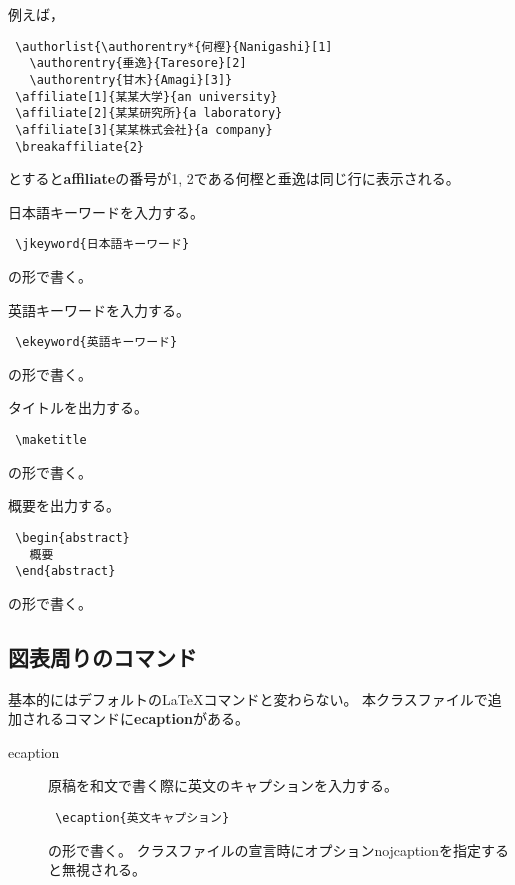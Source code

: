 \documentclass[fleqn]{ieej-tec2}%
\newcommand{\bs}{\texttt{\symbol{'134}}}
\begin{document}
\begin{description}
例えば，
\begin{verbatim}
 \authorlist{\authorentry*{何樫}{Nanigashi}[1]
   \authorentry{垂逸}{Taresore}[2] 
   \authorentry{甘木}{Amagi}[3]}
 \affiliate[1]{某某大学}{an university}
 \affiliate[2]{某某研究所}{a laboratory}
 \affiliate[3]{某某株式会社}{a company}
 \breakaffiliate{2}        
\end{verbatim}
とすると\textbf{\bs affiliate}の番号が1, 2である何樫と垂逸は同じ行に表示される。

\item[\bs jkeyword]
日本語キーワードを入力する。
\begin{verbatim}
 \jkeyword{日本語キーワード}
\end{verbatim}
の形で書く。

\item[\bs ekeyword]
英語キーワードを入力する。
\begin{verbatim}
 \ekeyword{英語キーワード}
\end{verbatim}
の形で書く。

\item[\bs maketitle]
タイトルを出力する。
\begin{verbatim}
 \maketitle
\end{verbatim}
の形で書く。

\item[abstract環境]
概要を出力する。
\begin{verbatim}
 \begin{abstract}
   概要
 \end{abstract}
\end{verbatim}
の形で書く。

\end{description}

\subsection{図表周りのコマンド}
基本的にはデフォルトの\LaTeX コマンドと変わらない。
本クラスファイルで追加されるコマンドに\textbf{\bs ecaption}がある。

\begin{description}
\item[\bs ecaption]
原稿を和文で書く際に英文のキャプションを入力する。
\begin{verbatim}
 \ecaption{英文キャプション}
\end{verbatim}
の形で書く。
クラスファイルの宣言時にオプションnojcaptionを指定すると無視される。

\end{description}
\end{document}

